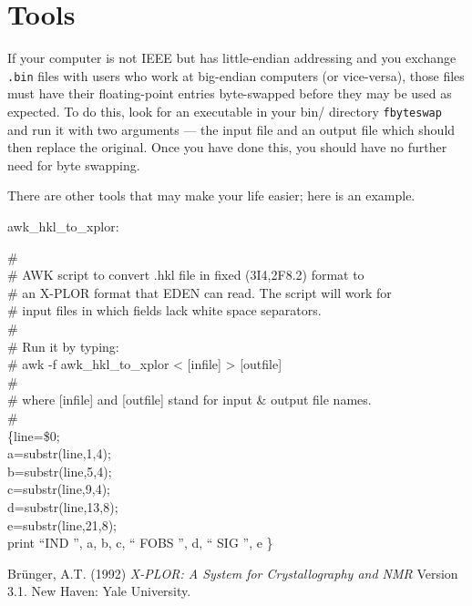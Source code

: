 \documentclass{report}
\begin{document}
{\chapter {Tools}
\label{app-tools}

If your computer is not IEEE but has little-endian addressing and you 
exchange {\tt .bin} files with users who work at big-endian computers
(or vice-versa), those files must have their floating-point entries 
byte-swapped before they may be used as expected.
To do this, look for an executable in your bin/
directory {\tt fbyteswap} and run it with two arguments --- 
the input file and an output 
file which should then replace the original.  Once you have done this, you
should have no further need for byte swapping.

There are other tools that may make your life easier; 
here is an example.     

awk\_hkl\_to\_xplor:

\# \\
\#       AWK script to convert .hkl file in fixed (3I4,2F8.2) format to  \\
\#       an X-PLOR format that EDEN can read.  The script will work for \\
\#       input files in which fields lack white space separators. \\
\# \\
\#       Run it by typing: \\
\#               awk -f awk\_hkl\_to\_xplor < [infile] > [outfile] \\
\# \\
\#       where [infile] and [outfile] stand for input \& output file names. \\
\# \\
\{line=\$0; \\
a=substr(line,1,4);  \\
b=substr(line,5,4);  \\
c=substr(line,9,4);  \\
d=substr(line,13,8); \\
e=substr(line,21,8);  \\
print ``IND '', a, b, c, `` FOBS '', d, `` SIG '', e \} \\


\begin{thebibliography}{99}


 Br\"{u}nger, A.T. (1992)
{\em X-PLOR: A System for Crystallography and NMR} Version 3.1.  
New Haven: Yale University.


\end{thebibliography}}
\end{document}
